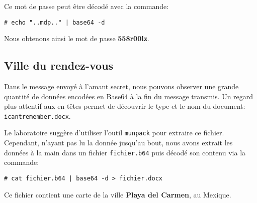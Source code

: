 \documentclass[11pt,a4paper]{article}
\newcommand{\shellcmd}[1]{\texttt{\footnotesize\# #1}}
\begin{document}
Ce mot de passe peut être décodé avec la commande:

\shellcmd{echo "..mdp.." | base64 -d}

Nous obtenons ainsi le mot de passe \textbf{558r00lz}.

\subsection{Ville du rendez-vous}

Dans le message envoyé à l'amant secret, nous pouvons observer une grande quantité de données encodées en Base64 à la fin du message transmis. Un regard plus attentif aux en-têtes permet de découvrir le type et le nom du document: \texttt{icantremember.docx}.

Le laboratoire suggère d'utiliser l'outil \texttt{munpack} pour extraire ce fichier. Cependant, n'ayant pas lu la donnée jusqu'au bout, nous avons extrait les données à la main dans un fichier \texttt{fichier.b64} puis décodé son contenu via la commande:

\shellcmd{cat fichier.b64 | base64 -d > fichier.docx}

Ce fichier contient une carte de la ville \textbf{Playa del Carmen}, au Mexique.
\end{document}

